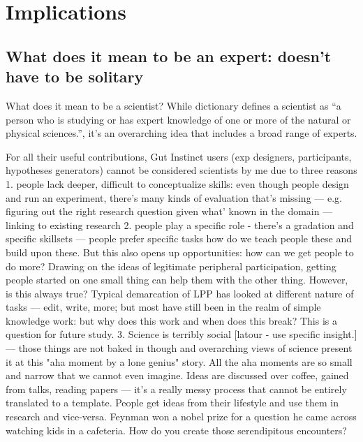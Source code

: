 

\section{Implications}


\subsection{What does it mean to be an expert: doesn’t have to be solitary} 
What does it mean to be a scientist? While dictionary defines a scientist as “a person who is studying or has expert knowledge of one or more of the natural or physical sciences.”, it’s an overarching idea that includes a broad range of experts. 

For all their useful contributions, Gut Instinct users (exp designers, participants, hypotheses generators) cannot be considered scientists by me due to three reasons
1. people lack deeper, difficult to conceptualize skills:  even though people design and run an experiment, there’s many kinds of evaluation that’s missing — e.g. figuring out the right research question given what’ known in the domain — linking to existing research
2. people play a specific role - there’s a gradation and specific skillsets — people prefer specific tasks how do we teach people these and build upon these. But this also opens up opportunities:  how can we get people to do more? Drawing on the ideas of legitimate peripheral participation, getting people started on one small thing can help them with the other thing. However, is this always true? Typical demarcation of LPP has looked at different nature of tasks — edit, write, more; but most have still been in the realm of simple knowledge work: but why does this work and when does this break? This is a question for future study.
3. Science is terribly social [latour - use specific insight.] — those things are not baked in though and overarching views of science present it at this "aha moment by a lone genius" story. All the aha moments are so small and narrow that we cannot even imagine. Ideas are discussed over coffee, gained from talks, reading papers — it’s a really messy process that cannot be entirely translated to a template. People get ideas from their lifestyle and use them in research and vice-versa. Feynman won a nobel prize for a question he came across watching kids in a cafeteria. How do you create those serendipitous encounters?


